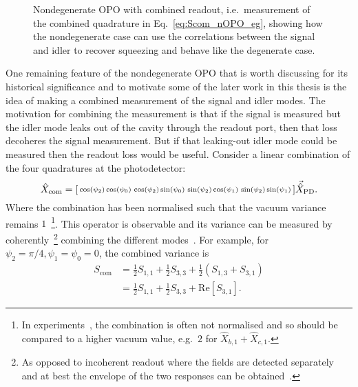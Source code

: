 \begin{figure}
	\centering
	\caption{Nondegenerate OPO with combined readout, i.e.\ measurement of the combined quadrature in Eq.~\ref{eq:Scom_nOPO_eg}, showing how the nondegenerate case can use the correlations between the signal and idler to recover squeezing and behave like the degenerate case.}
	\label{fig:nOPO_combined_readout}
\end{figure}

One remaining feature of the nondegenerate OPO that is worth discussing for its historical significance and to motivate some of the later  work in this thesis is the idea of making a combined measurement of the signal and idler modes. The motivation for combining the measurement is that if the signal is measured but the idler mode leaks out of the cavity through the readout port, then that loss decoheres the signal measurement. But if that leaking-out idler mode could be measured then the readout loss would be useful. Consider a linear combination of the four quadratures at the photodetector: \begin{equation}\hat X_\text{com}=\begin{bsmallmatrix}\cos(\psi_2)\cos(\psi_0) & \cos(\psi_2)\sin(\psi_0) & \sin(\psi_2)\cos(\psi_1) & \sin(\psi_2)\sin(\psi_1)\end{bsmallmatrix}\vec{\hat X}_\text{PD}.\end{equation} 
Where the combination has been normalised such that the vacuum variance remains $1$~\footnote{In experiments~\cite{Schori2001}, the combination is often not normalised and so should be compared to a higher vacuum value, e.g.\ $2$ for $\hat X_{b,1} + \hat X_{c,1}$.}. This operator is observable and its variance can be measured by coherently~\footnote{As opposed to incoherent readout where the fields are detected separately and at best the envelope of the two responses can be obtained~\cite{}.} combining the different modes~\cite{Schori2001}.  
For example, for $\psi_2=\pi/4,\psi_1=\psi_0=0$, the combined variance is
\begin{align}\label{eq:Scom_nOPO_eg}
S_\text{com}&=\frac{1}{2}S_{1,1}+\frac{1}{2}S_{3,3}+\frac{1}{2}(S_{1,3}+S_{3,1})\\
&=\frac{1}{2}S_{1,1}+\frac{1}{2}S_{3,3}+\text{Re}[S_{3,1}].\end{align} 
